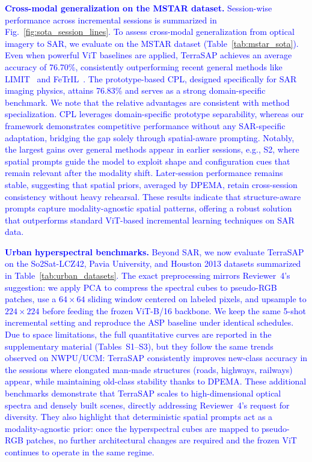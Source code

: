 ﻿\documentclass[letterpaper,journal]{IEEEtran}
\begin{document}
\textcolor{blue}{\textbf{Cross-modal generalization on the MSTAR dataset.}}
\textcolor{blue}{Session-wise performance across incremental sessions is summarized in Fig.~\ref{fig:sota_session_lines}. To assess cross-modal generalization from optical imagery to SAR, we evaluate on the MSTAR dataset (Table~\ref{tab:mstar_sota}). Even when powerful ViT baselines are applied, TerraSAP achieves an average accuracy of 76.70\%, consistently outperforming recent general methods like LIMIT~\cite{zhou2023limit} and FeTrIL~\cite{petit2023fetril}. The prototype-based CPL, designed specifically for SAR imaging physics, attains 76.83\% and serves as a strong domain-specific benchmark.}
\textcolor{blue}{We note that the relative advantages are consistent with method specialization. CPL leverages domain-specific prototype separability, whereas our framework demonstrates competitive performance without any SAR-specific adaptation, bridging the gap solely through spatial-aware prompting. Notably, the largest gains over general methods appear in earlier sessions, e.g., S2, where spatial prompts guide the model to exploit shape and configuration cues that remain relevant after the modality shift.}
\textcolor{blue}{Later-session performance remains stable, suggesting that spatial priors, averaged by DPEMA, retain cross-session consistency without heavy rehearsal. These results indicate that structure-aware prompts capture modality-agnostic spatial patterns, offering a robust solution that outperforms standard ViT-based incremental learning techniques on SAR data.}

\textcolor{blue}{\textbf{Urban hyperspectral benchmarks.}}
\textcolor{blue}{Beyond SAR, we now evaluate TerraSAP on the So2Sat-LCZ42, Pavia University, and Houston 2013 datasets summarized in Table~\ref{tab:urban_datasets}. The exact preprocessing mirrors Reviewer~4's suggestion: we apply PCA to compress the spectral cubes to pseudo-RGB patches, use a $64\times64$ sliding window centered on labeled pixels, and upsample to $224\times224$ before feeding the frozen ViT-B/16 backbone. We keep the same 5-shot incremental setting and reproduce the ASP baseline under identical schedules. Due to space limitations, the full quantitative curves are reported in the supplementary material (Tables~S1--S3), but they follow the same trends observed on NWPU/UCM: TerraSAP consistently improves new-class accuracy in the sessions where elongated man-made structures (roads, highways, railways) appear, while maintaining old-class stability thanks to DPEMA.}
\textcolor{blue}{These additional benchmarks demonstrate that TerraSAP scales to high-dimensional optical spectra and densely built scenes, directly addressing Reviewer~4's request for diversity. They also highlight that deterministic spatial prompts act as a modality-agnostic prior: once the hyperspectral cubes are mapped to pseudo-RGB patches, no further architectural changes are required and the frozen ViT continues to operate in the same regime.}
\end{document}
